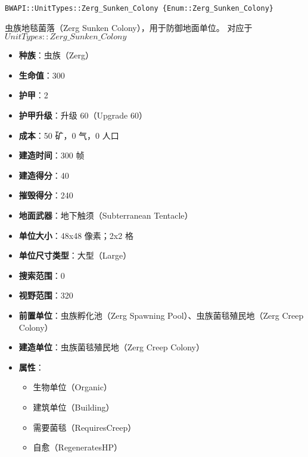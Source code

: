 \begin{tcolorbox}[colback=white, colframe=black!60!white, title=Zerg\_Sunken\_Colony(), arc=0mm]
    \begin{verbatim}
BWAPI::UnitTypes::Zerg_Sunken_Colony {Enum::Zerg_Sunken_Colony}
    \end{verbatim}
    虫族地毯菌落（Zerg Sunken Colony），用于防御地面单位。
    对应于  $UnitTypes::Zerg\_Sunken\_Colony$ 
    \begin{itemize}
        \item \textbf{种族}：虫族（Zerg）
        \item \textbf{生命值}：300
        \item \textbf{护甲}：2
        \item \textbf{护甲升级}：升级 60（Upgrade 60）
        \item \textbf{成本}：50 矿，0 气，0 人口
        \item \textbf{建造时间}：300 帧
        \item \textbf{建造得分}：40
        \item \textbf{摧毁得分}：240
        \item \textbf{地面武器}：地下触须（Subterranean Tentacle）
        \item \textbf{单位大小}：48x48 像素；2x2 格
        \item \textbf{单位尺寸类型}：大型（Large）
        \item \textbf{搜索范围}：0
        \item \textbf{视野范围}：320
        \item \textbf{前置单位}：虫族孵化池（Zerg Spawning Pool）、虫族菌毯殖民地（Zerg Creep Colony）
        \item \textbf{建造单位}：虫族菌毯殖民地（Zerg Creep Colony）
        \item \textbf{属性}：
            \begin{itemize}
                \item 生物单位（Organic）
                \item 建筑单位（Building）
                \item 需要菌毯（RequiresCreep）
                \item 自愈（RegeneratesHP）
            \end{itemize}
    \end{itemize}
\end{tcolorbox}

